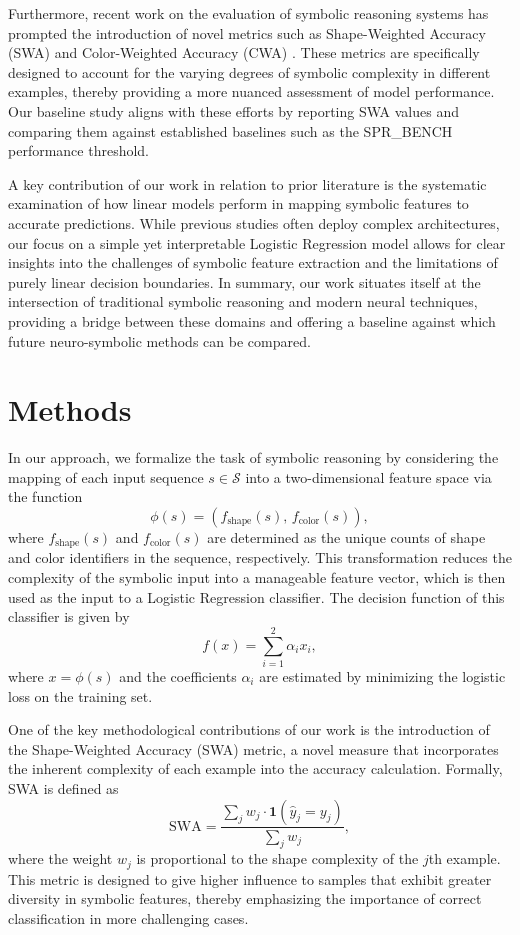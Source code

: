 \documentclass{article}
\begin{document}
Furthermore, recent work on the evaluation of symbolic reasoning systems has prompted the introduction of novel metrics such as Shape-Weighted Accuracy (SWA) and Color-Weighted Accuracy (CWA) \cite{new_metrics}. These metrics are specifically designed to account for the varying degrees of symbolic complexity in different examples, thereby providing a more nuanced assessment of model performance. Our baseline study aligns with these efforts by reporting SWA values and comparing them against established baselines such as the SPR\_BENCH performance threshold.

A key contribution of our work in relation to prior literature is the systematic examination of how linear models perform in mapping symbolic features to accurate predictions. While previous studies often deploy complex architectures, our focus on a simple yet interpretable Logistic Regression model allows for clear insights into the challenges of symbolic feature extraction and the limitations of purely linear decision boundaries. In summary, our work situates itself at the intersection of traditional symbolic reasoning and modern neural techniques, providing a bridge between these domains and offering a baseline against which future neuro-symbolic methods can be compared.

\section{Methods}
In our approach, we formalize the task of symbolic reasoning by considering the mapping of each input sequence \( s \in \mathcal{S} \) into a two-dimensional feature space via the function
\[
\phi(s) = \left(f_{\text{shape}}(s),\, f_{\text{color}}(s)\right),
\]
where \( f_{\text{shape}}(s) \) and \( f_{\text{color}}(s) \) are determined as the unique counts of shape and color identifiers in the sequence, respectively. This transformation reduces the complexity of the symbolic input into a manageable feature vector, which is then used as the input to a Logistic Regression classifier. The decision function of this classifier is given by
\[
f(x)=\sum_{i=1}^{2}\alpha_i x_i,
\]
where \( x = \phi(s) \) and the coefficients \(\alpha_i\) are estimated by minimizing the logistic loss on the training set.

One of the key methodological contributions of our work is the introduction of the Shape-Weighted Accuracy (SWA) metric, a novel measure that incorporates the inherent complexity of each example into the accuracy calculation. Formally, SWA is defined as
\[
\text{SWA} = \frac{\sum_{j} w_j \cdot \mathbf{1}(\hat{y}_j=y_j)}{\sum_{j} w_j},
\]
where the weight \(w_j\) is proportional to the shape complexity of the \(j\)th example. This metric is designed to give higher influence to samples that exhibit greater diversity in symbolic features, thereby emphasizing the importance of correct classification in more challenging cases.
\end{document}
